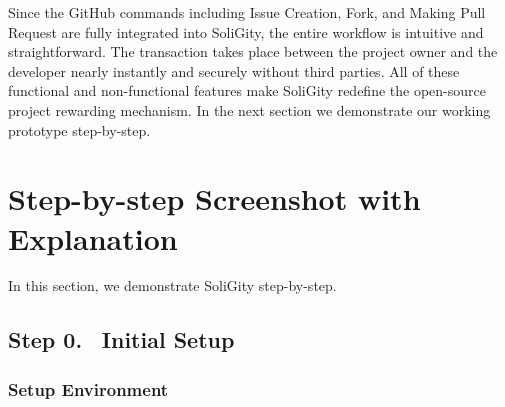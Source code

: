 \documentclass[12pt]{article}
\renewcommand{\_}{\kern-1.5pt\textunderscore\kern-1.5pt}
\begin{document}
\noindent Since the GitHub commands including Issue Creation, Fork, and Making Pull Request are fully integrated
into SoliGity, the entire workflow is intuitive and straightforward. The transaction takes place between the
project owner and the developer nearly instantly and securely without third parties. All of these functional and
non-functional features make SoliGity redefine the open-source project rewarding mechanism. In the next section
we demonstrate our working prototype step-by-step.

\section{Step-by-step Screenshot with Explanation}
In this section, we demonstrate SoliGity step-by-step.

\renewcommand\thesubsection{Step \arabic{subsection}.}
\renewcommand\thesubsubsection{\arabic{subsubsection}.}

\subsection*{Step 0. \(\;\;\)Initial Setup}

\subsubsection{Setup Environment}
\end{document}
